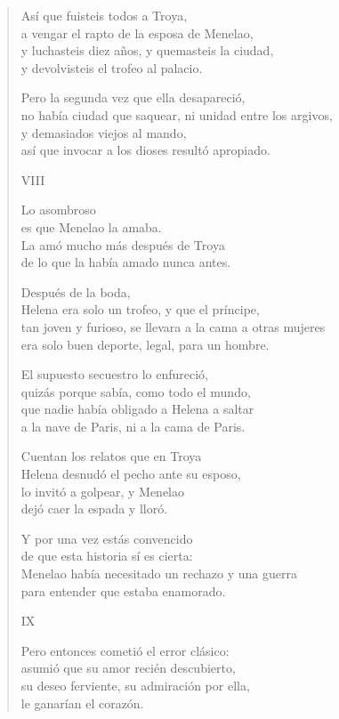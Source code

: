 \documentclass[11pt,a4paper]{article}
\begin{document}
\begin{verse}
Así que fuisteis todos a Troya,\\
a vengar el rapto de la esposa de Menelao,\\
y luchasteis diez años, y quemasteis la ciudad,\\
y devolvisteis el trofeo al palacio.

Pero la segunda vez que ella desapareció,\\
no había ciudad que saquear, ni unidad entre los argivos,\\
y demasiados viejos al mando,\\
así que invocar a los dioses resultó apropiado.

VIII

Lo asombroso\\
es que Menelao la amaba.\\
La amó mucho más después de Troya\\
de lo que la había amado nunca antes.

Después de la boda,\\
Helena era solo un trofeo, y que el príncipe,\\
tan joven y furioso, se llevara a la cama a otras mujeres\\
era solo buen deporte, legal, para un hombre.

El supuesto secuestro lo enfureció,\\
quizás porque sabía, como todo el mundo,\\
que nadie había obligado a Helena a saltar\\
a la nave de Paris, ni a la cama de Paris.

Cuentan los relatos que en Troya\\
Helena desnudó el pecho ante su esposo,\\
lo invitó a golpear, y Menelao\\
dejó caer la espada y lloró.

Y por una vez estás convencido\\
de que esta historia sí es cierta:\\
Menelao había necesitado un rechazo y una guerra\\
para entender que estaba enamorado.

IX

Pero entonces cometió el error clásico:\\
asumió que su amor recién descubierto,\\
su deseo ferviente, su admiración por ella,\\
le ganarían el corazón.


\end{verse}
\end{document}
